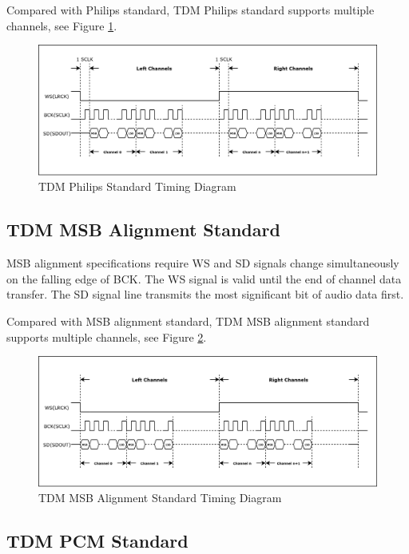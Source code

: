 \documentclass[main\_\_CN.tex]{subfiles}
\begin{document}
Compared with Philips standard, TDM Philips standard supports multiple channels, see Figure  \ref{Figure:i2s_phillips_standard}.
\begin{figure}[H]
    \centering
    \includegraphics[width=1.0\textwidth]{03-I2S/figures/i2s_tdm_phillips_mode.png}
    \caption{TDM Philips Standard Timing Diagram}
    \label{Figure:i2s_phillips_standard}
\end{figure}

\subsection{TDM MSB Alignment Standard}

MSB alignment specifications require WS and SD signals change simultaneously on the falling edge of BCK. The WS signal is valid until the end of channel data transfer. The SD signal line transmits the most significant bit of audio data first.

Compared with MSB alignment standard, TDM MSB alignment standard supports multiple channels, see Figure  \ref{Figure:i2s_MSB_32_mode}.

\begin{figure}[H]
    \centering
    \includegraphics[width=1.0\textwidth]{03-I2S/figures/i2s_tdm_msb_mode.png}
    \caption{TDM MSB Alignment Standard Timing Diagram}
    \label{Figure:i2s_MSB_32_mode}
\end{figure}

\subsection{TDM PCM Standard}
\end{document}
